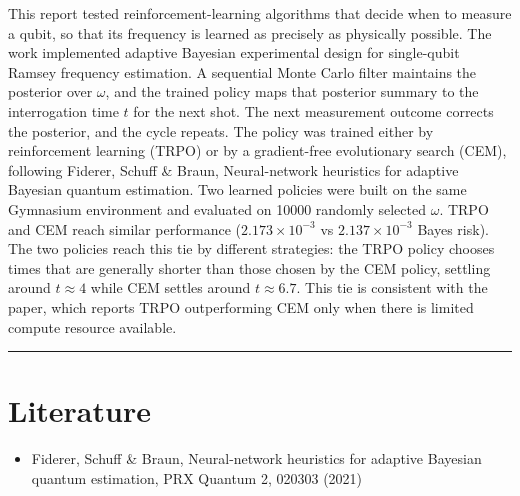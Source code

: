 \documentclass[12pt,a4paper]{article}
\begin{document}
This report tested reinforcement-learning algorithms that decide when to measure a qubit, so that
its frequency is learned as precisely as physically possible. The work implemented adaptive
Bayesian experimental design for single-qubit Ramsey frequency estimation. A sequential Monte
Carlo filter maintains the posterior over $\omega$, and the trained policy maps that posterior
summary to the interrogation time $t$ for the next shot. The next measurement outcome corrects
the posterior, and the cycle repeats. The policy was trained either by reinforcement learning
(TRPO) or by a gradient-free evolutionary search (CEM), following Fiderer, Schuff \& Braun,
Neural-network heuristics for adaptive Bayesian quantum estimation. Two learned policies
were built on the same Gymnasium environment and evaluated on \num{10000} randomly selected
$\omega$. TRPO and CEM reach similar performance ($2.173\times10^{-3}$ vs $2.137\times10^{-3}$
Bayes risk). The two policies reach this tie by different strategies: the TRPO
policy chooses times that are generally shorter than those chosen by the CEM policy, settling
around $t \approx 4$ while CEM settles around $t \approx 6.7$. This tie is consistent with the
paper, which reports TRPO outperforming CEM only when there is limited compute resource available.
\noindent\rule{\textwidth}{0.4pt}
\FloatBarrier
\section{Literature}\label{sec:literature}
\begin{itemize}
  \item Fiderer, Schuff \& Braun, Neural-network heuristics for adaptive Bayesian quantum
  estimation, PRX Quantum 2, 020303 (2021)
\end{itemize}
\end{document}

